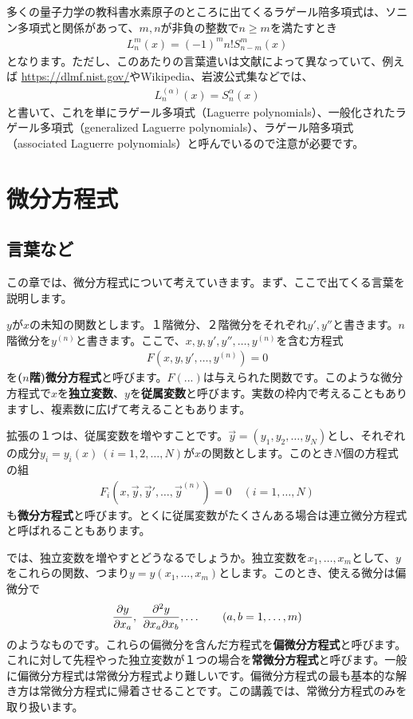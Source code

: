 \documentclass[report,paper=a4, fontsize=12pt, line_length=16cm, number_of_lines=33,dvipdfmx]{jlreq}
\numberwithin{equation}{section}
\newcommand{\strong}[1]{\textsf{\bfseries #1}}
\newcommand{\yv}{\vec{y}}
\begin{document}
多くの量子力学の教科書水素原子のところに出てくるラゲール陪多項式は、ソニン多項式と関係があって、$m,n$が非負の整数で$n\ge m$を満たすとき
\begin{align}
  L^{m}_{n}(x)=(-1)^m n! S^{m}_{n-m}(x)
\end{align}
となります。ただし、このあたりの言葉遣いは文献によって異なっていて、例えば
\url{https://dlmf.nist.gov/}やWikipedia、岩波公式集などでは、
\begin{align}
  L_{n}^{(\alpha)}(x)=S^{\alpha}_{n}(x)
\end{align}
と書いて、これを単にラゲール多項式（Laguerre polynomials）、一般化されたラゲール多項式（generalized Laguerre polynomials）、ラゲール陪多項式（associated Laguerre polynomials）と呼んでいるので注意が必要です。

\chapter{微分方程式}\label{sec:ode}
\section{言葉など}
この章では、微分方程式について考えていきます。まず、ここで出てくる言葉を説明します。

$y$が$x$の未知の関数とします。１階微分、２階微分をそれぞれ$y',y''$と書きます。$n$階微分を$y^{(n)}$と書きます。ここで、$x,y,y',y'',\dots,y^{(n)}$を含む方程式
\begin{align}
  F(x,y,y',\dots,y^{(n)})=0
\end{align}
を\strong{($n$階)微分方程式}と呼びます。$F(...)$は与えられた関数です。このような微分方程式で$x$を\strong{独立変数}、$y$を\strong{従属変数}と呼びます。実数の枠内で考えることもありますし、複素数に広げて考えることもあります。

拡張の１つは、従属変数を増やすことです。$\yv=(y_1,y_2,\dots,y_N)$とし、それぞれの成分$y_i=y_i(x)\ (i=1,2,\dots,N)$が$x$の関数とします。このとき$N$個の方程式の組
\begin{align}
  F_i(x,\yv,\yv',\dots,\yv^{(n)})=0\quad (i=1,\dots,N)
\end{align}
も\strong{微分方程式}と呼びます。とくに従属変数がたくさんある場合は連立微分方程式と呼ばれることもあります。

では、独立変数を増やすとどうなるでしょうか。独立変数を$x_1,\dots,x_m$として、$y$をこれらの関数、つまり$y=y(x_1,\dots,x_m)$とします。このとき、使える微分は偏微分で
\begin{align}
  \pdv{y}{x_a},\ \pdv{y}{x_a}{x_b},\dots\qquad (a,b=1,\dots,m)
\end{align}
のようなものです。これらの偏微分を含んだ方程式を\strong{偏微分方程式}と呼びます。これに対して先程やった独立変数が１つの場合を\strong{常微分方程式}と呼びます。一般に偏微分方程式は常微分方程式より難しいです。偏微分方程式の最も基本的な解き方は常微分方程式に帰着させることです。この講義では、常微分方程式のみを取り扱います。
\end{document}
